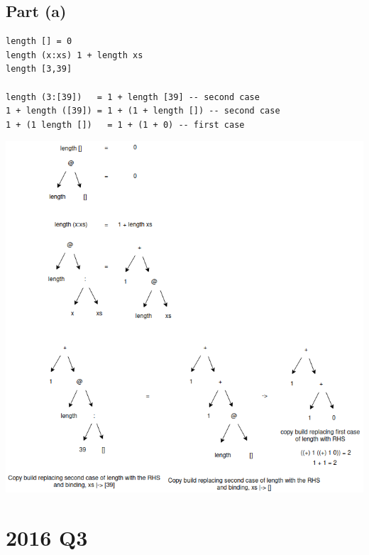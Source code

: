 \documentclass[11pt]{article}
\begin{document}
\subsection{Part (a)}
\label{sec:orgbbae674}
\begin{verbatim}
length [] = 0
length (x:xs) 1 + length xs
length [3,39]

length (3:[39])   = 1 + length [39] -- second case
1 + length ([39]) = 1 + (1 + length []) -- second case
1 + (1 length [])   = 1 + (1 + 0) -- first case
\end{verbatim}
\begin{center}
\includegraphics[width=160mm]{./length-xs.png}
\end{center}
\section{2016 Q3}
\label{sec:org3ba5018}
\end{document}

